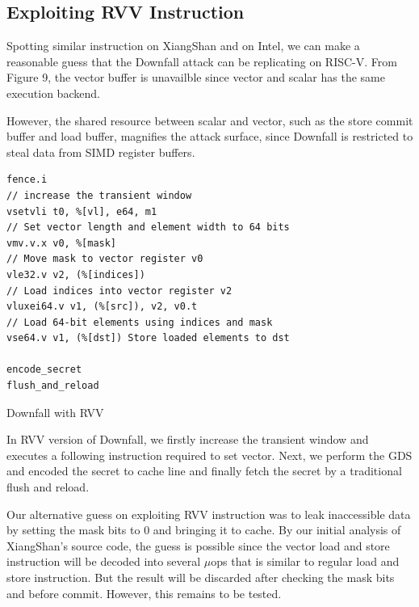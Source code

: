 \subsection{Exploiting RVV Instruction}
Spotting similar instruction on XiangShan and on Intel, we can make a reasonable guess that the Downfall attack can be replicating on RISC-V.
From Figure 9, the vector buffer is unavailble since vector and scalar has the same execution backend. 

However, the shared resource between scalar and vector, such as the store commit buffer and load buffer, magnifies the attack surface, since
Downfall is restricted to steal data from SIMD register buffers.

\begin{listing}[!htbp]
\begin{verbatim}
fence.i
// increase the transient window
vsetvli t0, %[vl], e64, m1 
// Set vector length and element width to 64 bits
vmv.v.x v0, %[mask]
// Move mask to vector register v0
vle32.v v2, (%[indices])
// Load indices into vector register v2
vluxei64.v v1, (%[src]), v2, v0.t
// Load 64-bit elements using indices and mask
vse64.v v1, (%[dst]) Store loaded elements to dst

encode_secret
flush_and_reload
\end{verbatim}
\label{listing:spectre_vulnerable}
\caption{Downfall with RVV}
\end{listing}

In RVV version of Downfall, we firstly increase the transient window and executes a following instruction required to set vector. Next, we perform
the GDS and encoded the secret to cache line and finally fetch the secret by a traditional flush and reload.

Our alternative guess on exploiting RVV instruction was to leak inaccessible data by setting the mask bits to 0 and bringing it to cache.
By our initial analysis of XiangShan's source code, the guess is possible since the vector load and store instruction will be decoded into 
several $\mu$ops that is similar to regular load and store instruction. But the result will be discarded after checking the mask bits and before commit.
However, this remains to be tested.